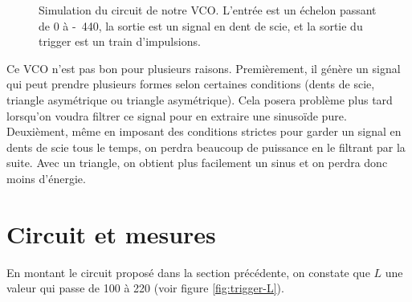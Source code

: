 \begin{figure}[ht]
	\centering
	\caption{Simulation du circuit de notre VCO. L'entrée est un échelon
	passant de \unit{0}{\volt} à \unit{-440}{\milli\volt}, la sortie
	est un signal en dent de scie, et la sortie du trigger est un train
	d'impulsions.}
	\label{fig:simulation}
\end{figure}

\begin{correction}
	Ce VCO n'est pas bon pour plusieurs raisons. Premièrement, il
	génère un signal qui peut prendre plusieurs formes selon
	certaines conditions (dents de scie, triangle asymétrique
	ou triangle asymétrique). Cela posera problème plus tard
	lorsqu'on voudra filtrer ce signal pour en extraire une
	sinusoïde pure. Deuxièment, même en imposant des conditions
	strictes pour garder un signal en dents de scie tous le temps,
	on perdra beaucoup de puissance en le filtrant par la suite.
	Avec un triangle, on obtient plus facilement un sinus et
	on perdra donc moins d'énergie.
\end{correction}

\newpage

\section{Circuit et mesures}
En montant le circuit proposé dans la section précédente, on
constate que $L$ une valeur qui passe de \unit{100}{\milli\volt} à \unit{220}{\milli\volt} (voir figure \ref{fig:trigger-L}).

